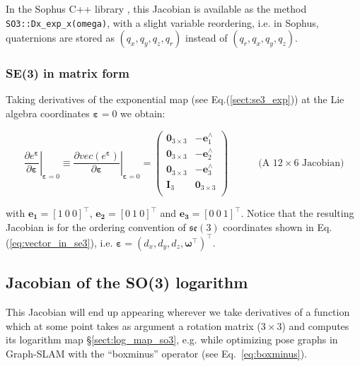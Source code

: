 \documentclass[a4paper,11pt]{report}
\newcommand{\E}{{\bm{\varepsilon}}}
\newcommand{\W}{{\bm{\omega}}}
\newcommand{\hatop}[1]{#1^\wedge}
\begin{document}
In the Sophus C++ library \cite{sophus}, this Jacobian is available as the method \texttt{SO3::Dx\_exp\_x(omega)}, 
with a slight variable reordering, i.e. in Sophus, quaternions are stored as $(q_x,q_y,q_z,q_r)$ instead of $(q_r,q_x,q_y,q_z)$.

\subsubsection{SE(3) in matrix form}

Taking derivatives of the exponential map (see Eq.(\ref{sect:se3_exp})) at the Lie algebra coordinates $\E=0$ we obtain:

\begin{equation}
\left. \frac{\partial e^\E}{\partial \E} \right|_{\E=0}
\equiv
\left. \frac{\partial vec(e^\E)}{\partial \E} \right|_{\E=0}
=
\left(
\begin{array}{cc}
 \mathbf{0}_{3\times 3}  & -\hatop{\mathbf{e}}_1 \\
 \mathbf{0}_{3\times 3}  & -\hatop{\mathbf{e}}_2 \\
 \mathbf{0}_{3\times 3}  & -\hatop{\mathbf{e}}_3 \\
 \mathbf{I}_{3}  & \mathbf{0}_{3\times 3} \\
\end{array}
\right)
\quad\quad\quad \text{(A $12 \times 6$ Jacobian)}
\end{equation}

\noindent with $\mathbf{e_1}=[1 ~ 0 ~ 0]^\top$,
$\mathbf{e_2}=[0 ~ 1 ~ 0]^\top$ and
$\mathbf{e_3}=[0 ~ 0 ~ 1]^\top$.
Notice that the resulting Jacobian is for the
ordering convention of $\mathfrak{se}(3)$ coordinates shown in Eq.(\ref{eq:vector_in_se3}), i.e. $\E = (d_x, d_y, d_z, \W^\top)^\top$.



\subsection{Jacobian of the SO(3) logarithm}
\label{sect:eq:jacob_dLnROT_dROT}

This Jacobian will end up appearing wherever we take derivatives of a function which at some point takes
as argument a rotation matrix ($3\times 3$) and computes its logarithm map \S\ref{sect:log_map_so3},
e.g. while optimizing pose graphs in Graph-SLAM with the 
``boxminus'' operator (see Eq.~\ref{eq:boxminus}).
\end{document}
